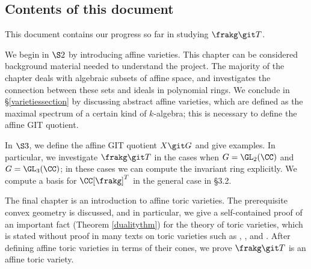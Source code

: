 \subsection{Contents of this document}
This document contains our progress so far in studying $\frakg \git T$.

We begin in $\S 2$ by introducing affine varieties.
This chapter can be considered background material needed to understand the project.
The majority of the chapter deals with algebraic subsets of affine space, and investigates the connection between these sets and ideals in polynomial rings.
We conclude in \S \ref{varietiessection} by discussing abstract affine varieties, which are defined as the maximal spectrum of a certain kind of $k$-algebra;
this is necessary to define the affine GIT quotient.

In $\S 3$, we define the affine GIT quotient $X \git G$ and give examples.
In particular, we investigate $\frakg \git T$ in the cases when $G = \GL_2(\CC)$ and $G = \GL_3(\CC)$; in these cases we can compute the invariant ring explicitly.
We compute a basis for $\CC[\frakg]^T$ in the general case in \S 3.2.

The final chapter is an introduction to affine toric varieties.
The prerequisite convex geometry is discussed, and in particular, we give a self-contained proof of an important fact (Theorem \ref{dualitythm}) for the theory of toric varieties, which is stated without proof in many texts on toric varieties such as \cite{Fulton93}, \cite{CLS11}, and \cite{Oda88}.
After defining affine toric varieties in terms of their cones, we prove $\frakg \git T$ is an affine toric variety.
